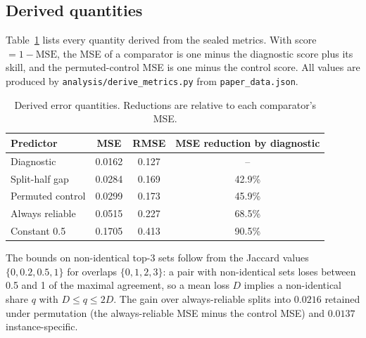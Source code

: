 \documentclass{article}
\begin{document}
\subsection{Derived quantities}
Table~\ref{tab:derived} lists every quantity derived from the sealed metrics. With score $=1-\text{MSE}$, the MSE of a comparator is one minus the diagnostic score plus its skill, and the permuted-control MSE is one minus the control score. All values are produced by \texttt{analysis/derive\_metrics.py} from \texttt{paper\_data.json}.
\begin{table}[h]
\centering
\caption{Derived error quantities. Reductions are relative to each comparator's MSE.}
\label{tab:derived}
\small
\begin{tabular}{lccc}
\toprule
Predictor & MSE & RMSE & MSE reduction by diagnostic \\
\midrule
Diagnostic & 0.0162 & 0.127 & -- \\
Split-half gap & 0.0284 & 0.169 & 42.9\% \\
Permuted control & 0.0299 & 0.173 & 45.9\% \\
Always reliable & 0.0515 & 0.227 & 68.5\% \\
Constant 0.5 & 0.1705 & 0.413 & 90.5\% \\
\bottomrule
\end{tabular}
\end{table}
The bounds on non-identical top-3 sets follow from the Jaccard values $\{0,0.2,0.5,1\}$ for overlaps $\{0,1,2,3\}$: a pair with non-identical sets loses between 0.5 and 1 of the maximal agreement, so a mean loss $D$ implies a non-identical share $q$ with $D\le q\le 2D$. The gain over always-reliable splits into $0.0216$ retained under permutation (the always-reliable MSE minus the control MSE) and $0.0137$ instance-specific.
\end{document}

